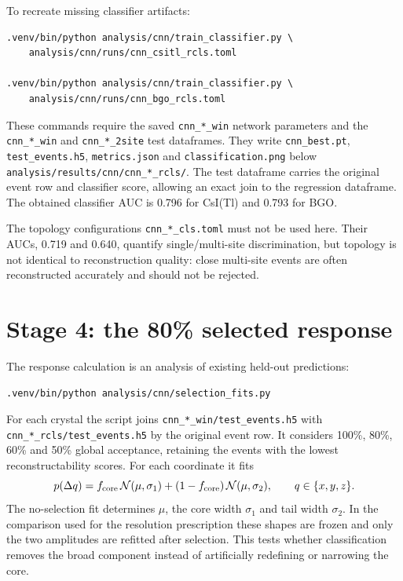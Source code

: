 \documentclass[11pt,a4paper]{article}
\newcommand{\code}[1]{\nolinkurl{#1}}
\newcommand{\csitl}{CsI(Tl)}
\begin{document}
To recreate missing classifier artifacts:

\begin{verbatim}
.venv/bin/python analysis/cnn/train_classifier.py \
    analysis/cnn/runs/cnn_csitl_rcls.toml

.venv/bin/python analysis/cnn/train_classifier.py \
    analysis/cnn/runs/cnn_bgo_rcls.toml
\end{verbatim}

These commands require the saved \code{cnn\_*\_win} network parameters and the
\code{cnn\_*\_win} and \code{cnn\_*\_2site} test dataframes. They write
\code{cnn\_best.pt}, \code{test\_events.h5}, \code{metrics.json} and
\code{classification.png} below \code{analysis/results/cnn/cnn\_*\_rcls/}.
The test dataframe carries the original event row and classifier score, allowing
an exact join to the regression dataframe. The obtained classifier AUC is
0.796 for \csitl{} and 0.793 for BGO.

The topology configurations \code{cnn\_*\_cls.toml} must not be used here.
Their AUCs, 0.719 and 0.640, quantify single/multi-site discrimination, but
topology is not identical to reconstruction quality: close multi-site events
are often reconstructed accurately and should not be rejected.

\section{Stage 4: the 80\% selected response}
\label{sec:selection}

The response calculation is an analysis of existing held-out predictions:

\begin{verbatim}
.venv/bin/python analysis/cnn/selection_fits.py
\end{verbatim}

For each crystal the script joins \code{cnn\_*\_win/test\_events.h5} with
\code{cnn\_*\_rcls/test\_events.h5} by the original event row. It considers
100\%, 80\%, 60\% and 50\% global acceptance, retaining the events with the
lowest reconstructability scores. For each coordinate it fits
\begin{equation}
 p(\Delta q)=f_{\rm core}\,
 \mathcal N(\mu,\sigma_1)+(1-f_{\rm core})\,
 \mathcal N(\mu,\sigma_2), \qquad q\in\{x,y,z\}.
\end{equation}
The no-selection fit determines $\mu$, the core width $\sigma_1$ and tail width
$\sigma_2$. In the comparison used for the resolution prescription these
shapes are frozen and only the two amplitudes are refitted after selection.
This tests whether classification removes the broad component instead of
artificially redefining or narrowing the core.
\end{document}
